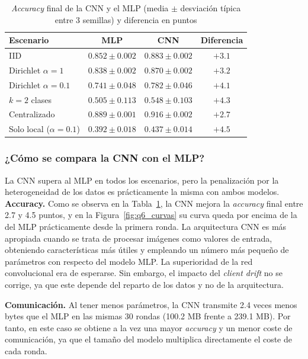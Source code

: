 \begin{table}[H]
    \centering
    \caption{\textit{Accuracy} final de la CNN y el MLP (media $\pm$ desviación típica entre 3 semillas) y diferencia
    en puntos}
    \label{tab:q6}
    \setlength{\tabcolsep}{5pt}
    \begin{tabular}{lccc}
        \hline
        Escenario & MLP & CNN & Diferencia \\
        \hline
        IID & $0.852 \pm 0.002$ & $0.883 \pm 0.002$ & $+3.1$ \\
        Dirichlet $\alpha=1$ & $0.838 \pm 0.002$ & $0.870 \pm 0.002$ & $+3.2$ \\
        Dirichlet $\alpha=0.1$ & $0.741 \pm 0.048$ & $0.782 \pm 0.046$ & $+4.1$ \\
        $k=2$ clases & $0.505 \pm 0.113$ & $0.548 \pm 0.103$ & $+4.3$ \\
        Centralizado & $0.889 \pm 0.001$ & $0.916 \pm 0.002$ & $+2.7$ \\
        Solo local ($\alpha=0.1$) & $0.392 \pm 0.018$ & $0.437 \pm 0.014$ & $+4.5$ \\
        \hline
    \end{tabular}
\end{table}

\subsubsection{¿Cómo se compara la CNN con el MLP?}
La CNN supera al MLP en todos los escenarios, pero la penalización por la heterogeneidad de los datos es
prácticamente la misma con ambos modelos.
\\

\textbf{Accuracy.} Como se observa en la Tabla~\ref{tab:q6}, la CNN mejora la \textit{accuracy} final entre 2.7 y
4.5 puntos, y en la Figura~\ref{fig:q6_curvas} su curva queda por encima de la del MLP prácticamente desde la primera
ronda. La arquitectura CNN es más apropiada cuando se trata de procesar imágenes como valores de entrada, obteniendo
características más útiles y empleando un número más pequeño de parámetros con respecto del modelo MLP. La superioridad
de la red convolucional era de esperarse. Sin embargo, el impacto del \textit{client drift} no se corrige, ya que este 
depende del reparto de los datos y no de la arquitectura.


\textbf{Comunicación.} Al tener menos parámetros, la CNN transmite 2.4 veces menos bytes que el MLP en las mismas 30
rondas (100.2 MB frente a 239.1 MB). Por tanto, en este caso se obtiene a la vez una mayor \textit{accuracy} y un
menor coste de comunicación, ya que el tamaño del modelo multiplica directamente el coste de cada ronda.